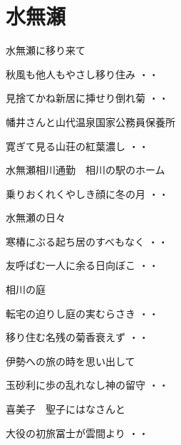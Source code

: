 \chapter {水無瀬}
水無瀬に移り来て
\begin{shiika}秋風も他人もやさし移り住み
\hfill{・・}\end{shiika}
\begin{shiika}見捨てかね新居に挿せり倒れ菊
\hfill{・・}\end{shiika}
\vspace{0.6cm}
幡井さんと山代温泉国家公務員保養所
\begin{shiika}寛ぎて見る山荘の紅葉濃し
\hfill{・・}\end{shiika}
\vspace{0.6cm}
水無瀬相川通勤　相川の駅のホーム
\begin{shiika}乗りおくれくやしき顔に冬の月
\hfill{・・}\end{shiika}
\vspace{0.6cm}
水無瀬の日々
\begin{shiika}寒椿にぶる起ち居のすべもなく
\hfill{・・}\end{shiika}
\vspace{0.6cm}
\begin{shiika}友呼ばむ一人に余る日向ぼこ
\hfill{・・}\end{shiika}
\vspace{0.6cm}
相川の庭
\begin{shiika}転宅の迫りし庭の実むらさき
\hfill{・・}\end{shiika}
\begin{shiika}移り住む名残の菊香衰えず
\hfill{・・}\end{shiika}
\vspace{0.6cm}
伊勢への旅の時を思い出して
\begin{shiika}玉砂利に歩の乱れなし神の留守
\hfill{・・}\end{shiika}
\vspace{0.6cm}
喜美子　聖子にはなさんと
\begin{shiika}大役の初旅冨士が雲間より
\hfill{・・}\end{shiika}
\vspace{0.6cm}
